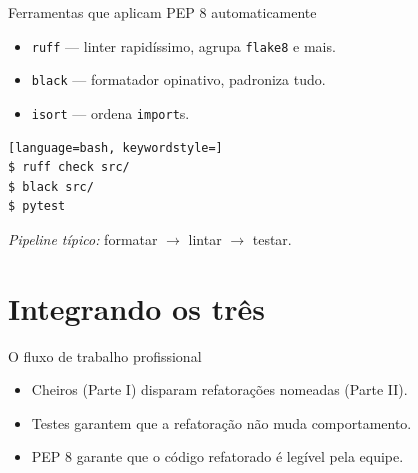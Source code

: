 \documentclass[aspectratio=169]{beamer}
\begin{document}
\begin{frame}[fragile]{Ferramentas que aplicam PEP 8 automaticamente}
  \begin{itemize}
    \item \texttt{ruff} --- linter rapidíssimo, agrupa \texttt{flake8} e mais.
    \item \texttt{black} --- formatador opinativo, padroniza tudo.
    \item \texttt{isort} --- ordena \texttt{import}s.
  \end{itemize}
  \vspace{0.5em}
\begin{lstlisting}[language=bash, keywordstyle=]
$ ruff check src/
$ black src/
$ pytest
\end{lstlisting}
  \footnotesize\emph{Pipeline típico:} formatar $\to$ lintar $\to$ testar.
\end{frame}

\section{Integrando os três}

\begin{frame}{O fluxo de trabalho profissional}
  \begin{center}
  \end{center}
  \begin{itemize}\footnotesize
    \item Cheiros (Parte I) disparam refatorações nomeadas (Parte II).
    \item Testes garantem que a refatoração não muda comportamento.
    \item PEP 8 garante que o código refatorado é legível pela equipe.
  \end{itemize}
\end{frame}
\end{document}

